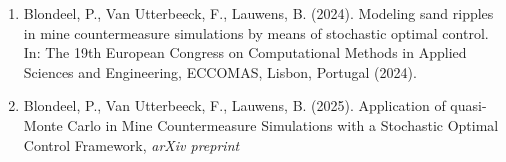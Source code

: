 \begin{talk}
\medskip
\begin{enumerate}
 \item[{[1]}] Blondeel, P., Van Utterbeeck, F., Lauwens, B. (2024). Modeling sand ripples in mine countermeasure simulations by means of stochastic optimal control. In: The 19th European Congress on Computational Methods in Applied Sciences and Engineering, ECCOMAS, Lisbon, Portugal (2024).
 \item[{[2]}] Blondeel, P., Van Utterbeeck, F., Lauwens, B. (2025).  Application of quasi-Monte Carlo in Mine Countermeasure Simulations with a Stochastic Optimal Control Framework, \textit{arXiv preprint}
\end{enumerate}

\end{talk}

